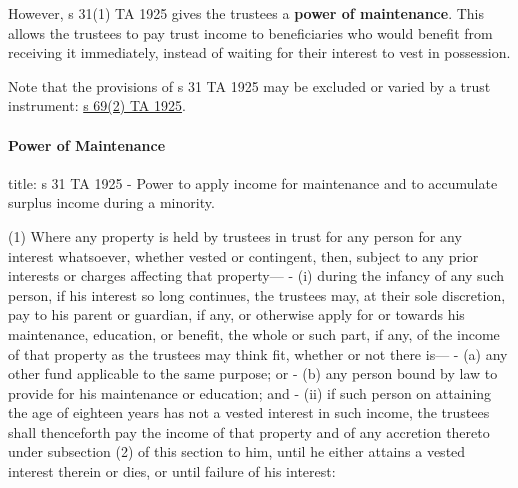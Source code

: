 \documentclass[
]{article}
\newenvironment{Shaded}{}{}
\newcommand{\NormalTok}[1]{#1}
\begin{document}
However, s 31(1) TA 1925 gives the trustees a \textbf{power of
maintenance}. This allows the trustees to pay trust income to
beneficiaries who would benefit from receiving it immediately, instead
of waiting for their interest to vest in possession.

Note that the provisions of s 31 TA 1925 may be excluded or varied by a
trust instrument:
\href{https://www.legislation.gov.uk/ukpga/Geo5/15-16/19/section/69}{s
69(2) TA 1925}.

\hypertarget{power-of-maintenance}{%
\paragraph{Power of Maintenance}\label{power-of-maintenance}}

\begin{Shaded}
\begin{Highlighting}[]
\NormalTok{title: s 31 TA 1925 {-}  Power to apply income for maintenance and to accumulate surplus income during a minority.}

\NormalTok{(1) Where any property is held by trustees in trust for any person for any interest whatsoever, whether vested or contingent, then, subject to any prior interests or charges affecting that property—}
\NormalTok{{-} (i) during the infancy of any such person, if his interest so long continues, the trustees may, at their sole discretion, pay to his parent or guardian, if any, or otherwise apply for or towards his maintenance, education, or benefit, the whole or such part, if any, of the income of that property as the trustees may think fit, whether or not there is—}
\NormalTok{    {-} (a) any other fund applicable to the same purpose; or}
\NormalTok{    {-} (b) any person bound by law to provide for his maintenance or education; and}
\NormalTok{{-} (ii) if such person on attaining the age of eighteen years has not a vested interest in such income, the trustees shall thenceforth pay the income of that property and of any accretion thereto under subsection (2) of this section to him, until he either attains a vested interest therein or dies, or until failure of his interest:}


\end{Highlighting}
\end{Shaded}
\end{document}
